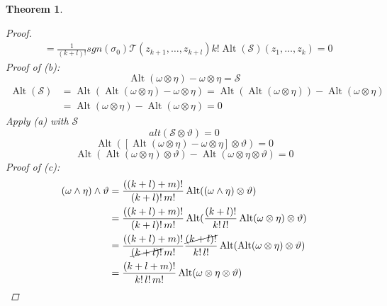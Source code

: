 \documentclass[11pt]{article}
\def\mat{\mathcal{T}}
\def\mas{\mathcal{S}}
\DeclareMathOperator{\alt}{Alt}
\newtheorem{theorem}{Theorem}[section]
\begin{document}
\begin{theorem}
\begin{proof}
\begin{align*}
&=\frac{1}{(k+l)!}sgn(\sigma_0)\mat(z_{k+1}, \dots, z_{k+l})k!\alt(\mas)(z_1, \dots, z_{k}) =0 
\end{align*}
Proof of (b):
\[\alt(\omega\otimes\eta) - \omega\otimes\eta =\mas\]
\begin{align*}
\alt(\mas) &= \alt(\alt(\omega\otimes\eta) - \omega\otimes\eta) = \alt(\alt(\omega\otimes\eta)) - \alt(\omega\otimes\eta)\\ &= \alt(\omega\otimes\eta) - \alt(\omega\otimes\eta) = 0 \end{align*}
Apply (a) with $\mas$
\[alt(\mas\otimes\vartheta) = 0\]
\[\alt([\alt(\omega\otimes\eta) - \omega\otimes\eta]\otimes\vartheta) = 0\]
\[\alt(\alt(\omega\otimes\eta)\otimes\vartheta) - \alt(\omega\otimes\eta\otimes\vartheta) = 0\]
Proof of (c):
\begin{align*}
(\omega\wedge\eta)\wedge\vartheta &= \frac{((k+l)+m)!}{(k+l)!\,m!}\alt((\omega\wedge\eta)\otimes\vartheta)\\
&=\frac{((k+l)+m)!}{(k+l)!\,m!}\alt(\frac{(k+l)!}{k!\,l!}\alt(\omega\otimes\eta)\otimes\vartheta)\\
&=\frac{((k+l)+m)!}{\cancel{(k+l)!}\,m!}\frac{\cancel{(k+l)!}}{k!\,l!}\alt(\alt(\omega\otimes\eta)\otimes\vartheta)\\
&= \frac{(k+l+m)!}{k!\, l!\,m!}\alt(\omega\otimes\eta\otimes\vartheta)
\end{align*}
\end{proof}
\end{theorem}
\end{document}
